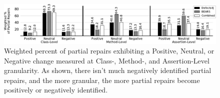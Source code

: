 \documentclass[10pt, conference]{IEEEtran}
\newcommand\todo[1]{\textcolor{red}{#1}}
\newcommand\bears{\textsc{Bears}\xspace}
\begin{document}

\begin{figure}
        \includegraphics[width=\textwidth]{img/weighted_percent.pdf}
        \caption{Weighted percent of partial repairs exhibiting a {\normalfont
            Positive}, {\normalfont Neutral}, or {\normalfont Negative} change
          measured at Class-, Method-, and Assertion-Level granularity. As shown, there isn't much negatively identified partial repairs, and the more granular, the more partial repairs become positively or negatively identified.}
        \label{fig:fitness}
\end{figure}
\end{document}
